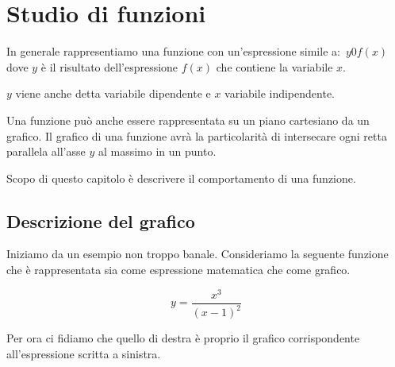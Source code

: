 


% 

\chapter{Studio di funzioni}

In generale rappresentiamo una funzione con un'espressione simile 
a:~\(y0f(x)\) dove \(y\) è il risultato dell'espressione \(f(x)\)
che contiene la variabile \(x\). 

\(y\) viene anche detta variabile dipendente e \(x\) variabile indipendente.

Una funzione può anche essere rappresentata su un piano cartesiano da un 
grafico. 
Il grafico di una funzione avrà la particolarità di intersecare ogni retta 
parallela all'asse \(y\) al massimo in un punto.

Scopo di questo capitolo è descrivere il comportamento di una funzione.

\section{Descrizione del grafico}
\label{sec:descrizione_grafico}
Iniziamo da un esempio non troppo banale. 
Consideriamo la seguente funzione che è rappresentata sia come espressione 
matematica che come grafico.

\begin{minipage}{.20\linewidth}
 \begin{center}
\[y=\frac{x^3}{(x-1)^2}\]
 \end{center}
\end{minipage}
\hfill
\begin{minipage}{.78\linewidth}
 \begin{center}
\funzionea
 \end{center}
\end{minipage}

Per ora ci fidiamo che quello di destra è proprio il grafico corrispondente 
all'espressione scritta a sinistra.

